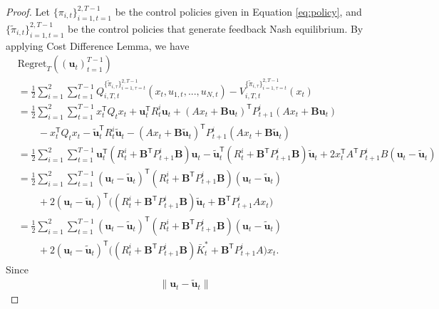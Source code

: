 \documentclass{article}
\newcommand{\contTilde}[1]{\mathbf{\tilde{#1}}}
\newcommand{\transpose}{\mathsf{T}}
\begin{document}
\begin{proof}
Let $\{\pi_{i,t}\}_{i=1,t=1}^{2,T-1}$ be the control policies given in Equation \eqref{eq:policy}, and $\{\tilde{\pi}_{i,t}\}_{i=1,t=1}^{2,T-1}$ be the control policies that generate feedback Nash equilibrium.
By applying Cost Difference Lemma, we have
\begin{align*}
    &\text{Regret}_{T}((\mathbf{u}_{t})_{t=1}^{T-1})\\
    &= \frac{1}{2}\sum_{i=1}^{2}\sum_{t=1}^{T-1} Q_{i,T,t}^{\{\tilde{\pi}_{i,\tau}\}_{i=1,\tau=t}^{2,T-1}}(x_{t},u_{1,t},...,u_{N,t}) -  V_{i,T,t}^{\{\tilde{\pi}_{i,\tau}\}_{i=1,\tau=t}^{2,T-1}}(x_{t})\\
    &= \frac{1}{2}\sum_{i=1}^{2}\sum_{t=1}^{T-1} x_{t}^{\transpose}Q_{t}x_{t} + \mathbf{u}_{t}^{\transpose}R_{t}^{i}\mathbf{u}_{t} + (Ax_{t}+\mathbf{B}\mathbf{u}_{t})^{\transpose}P_{t+1}^{i}(Ax_{t}+\mathbf{B}\mathbf{u}_{t})\\
    &\qquad - x_{t}^{\transpose}Q_{t}x_{t} - \contTilde{u}_{t}^{\transpose}R_{t}^{i}\contTilde{u}_{t} - (Ax_{t}+\mathbf{B}\contTilde{u}_{t})^{\transpose}P_{t+1}^{i}(Ax_{t}+\mathbf{B}\contTilde{u}_{t})\\
    &= \frac{1}{2}\sum_{i=1}^{2}\sum_{t=1}^{T-1} \mathbf{u}_{t}^{\transpose}(R_{t}^{i}+\mathbf{B}^{\transpose}P_{t+1}^{i}\mathbf{B})\mathbf{u}_{t}-\contTilde{u}_{t}^{\transpose}(R_{t}^{i}+\mathbf{B}^{\transpose}P_{t+1}^{i}\mathbf{B})\contTilde{u}_{t} + 2x_{t}^{\transpose}A^{\transpose}P_{t+1}^{i}B(\mathbf{u}_{t}-\contTilde{u}_{t})\\
    &= \frac{1}{2}\sum_{i=1}^{2}\sum_{t=1}^{T-1} (\mathbf{u}_{t}-\contTilde{u}_{t})^{\transpose}(R_{t}^{i}+\mathbf{B}^{\transpose}P_{t+1}^{i}\mathbf{B})(\mathbf{u}_{t}-\contTilde{u}_{t})\\
    &\qquad + 2(\mathbf{u}_{t}-\contTilde{u}_{t})^{\transpose}\bigg((R_{t}^{i}+\mathbf{B}^{\transpose}P_{t+1}^{i}\mathbf{B})\contTilde{u}_{t}+\mathbf{B}^{\transpose}P_{t+1}^{i}Ax_{t}\bigg)\\
    &= \frac{1}{2}\sum_{i=1}^{2}\sum_{t=1}^{T-1} (\mathbf{u}_{t}-\contTilde{u}_{t})^{\transpose}(R_{t}^{i}+\mathbf{B}^{\transpose}P_{t+1}^{i}\mathbf{B})(\mathbf{u}_{t}-\contTilde{u}_{t})\\
    &\qquad + 2(\mathbf{u}_{t}-\contTilde{u}_{t})^{\transpose}\bigg((R_{t}^{i}+\mathbf{B}^{\transpose}P_{t+1}^{i}\mathbf{B})\bar{K}_{t}^{*}+\mathbf{B}^{\transpose}P_{t+1}^{i}A\bigg)x_{t}.
\end{align*}
Since
\begin{align*}
    \|\mathbf{u}_{t} - \contTilde{u}_{t}\|

\end{align*}
\end{proof}
\end{document}
